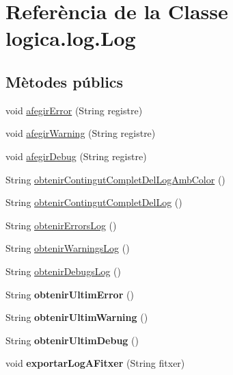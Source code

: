 \hypertarget{classlogica_1_1log_1_1_log}{\section{Referència de la Classe logica.\+log.\+Log}
\label{classlogica_1_1log_1_1_log}
}
\subsection*{Mètodes públics}
\begin{DoxyCompactItemize}
\item 
void \hyperlink{classlogica_1_1log_1_1_log_abdcf225ffc06e746b5d224c060b01f98}{afegir\+Error} (String registre)
\item 
void \hyperlink{classlogica_1_1log_1_1_log_af5a685966d6e6ef00d93c879b4f3154a}{afegir\+Warning} (String registre)
\item 
void \hyperlink{classlogica_1_1log_1_1_log_a22b7784b896630f85cd9791d02d13d70}{afegir\+Debug} (String registre)
\item 
String \hyperlink{classlogica_1_1log_1_1_log_a4f1a4853972d056a0da55189e4ebf4da}{obtenir\+Contingut\+Complet\+Del\+Log\+Amb\+Color} ()
\item 
String \hyperlink{classlogica_1_1log_1_1_log_a1902dfacc9adf60b63a801c7d32c4dcf}{obtenir\+Contingut\+Complet\+Del\+Log} ()
\item 
String \hyperlink{classlogica_1_1log_1_1_log_adbe0cf7e75ae815279d2e88cf110e29b}{obtenir\+Errors\+Log} ()
\item 
String \hyperlink{classlogica_1_1log_1_1_log_ad7447bfb49c4ec37d1a740a3d5750c63}{obtenir\+Warnings\+Log} ()
\item 
String \hyperlink{classlogica_1_1log_1_1_log_a8a577eb2906568f3501667482d80dfc0}{obtenir\+Debugs\+Log} ()
\item 
\hypertarget{classlogica_1_1log_1_1_log_a7d2d9d5951e933a735d4700d2d52c8ac}{String {\bfseries obtenir\+Ultim\+Error} ()}\label{classlogica_1_1log_1_1_log_a7d2d9d5951e933a735d4700d2d52c8ac}

\item 
\hypertarget{classlogica_1_1log_1_1_log_a06dd49f9ab88537f9f0c7a66749c2f7c}{String {\bfseries obtenir\+Ultim\+Warning} ()}\label{classlogica_1_1log_1_1_log_a06dd49f9ab88537f9f0c7a66749c2f7c}

\item 
\hypertarget{classlogica_1_1log_1_1_log_a19589f17f8be0527f89145d59ee64081}{String {\bfseries obtenir\+Ultim\+Debug} ()}\label{classlogica_1_1log_1_1_log_a19589f17f8be0527f89145d59ee64081}

\item 
\hypertarget{classlogica_1_1log_1_1_log_a9f9c696aee364b77288dffc4d6d57e8b}{void {\bfseries exportar\+Log\+A\+Fitxer} (String fitxer)}\label{classlogica_1_1log_1_1_log_a9f9c696aee364b77288dffc4d6d57e8b}

\end{DoxyCompactItemize}

